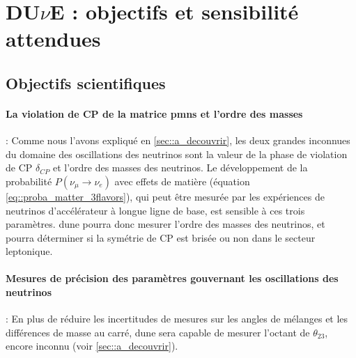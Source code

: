 
  \section{\texorpdfstring{DU$\nu$E}{DUNE} : objectifs et sensibilité attendues}\label{sec::dune}

    \subsection{Objectifs scientifiques}\label{sec::dune_pheno}

      \paragraph{La violation de CP de la matrice \gls{pmns} et l'ordre des masses} : Comme nous l'avons expliqué en \autoref{sec::a_decouvrir}, les deux grandes inconnues du domaine des oscillations des neutrinos sont la valeur de la phase de violation de CP $\delta_{CP}$ et l'ordre des masses des neutrinos. Le développement de la probabilité $P(\nu_{\mu}\to\nu_e)$ avec effets de matière (équation \eqref{eq::proba_matter_3flavors}), qui peut être mesurée par les expériences de neutrinos d'accélérateur à longue ligne de base, est sensible à ces trois paramètres. \gls{dune} pourra donc mesurer l'ordre des masses des neutrinos, et pourra déterminer si la symétrie de CP est brisée ou non dans le secteur leptonique.
        
      \paragraph{Mesures de précision des paramètres gouvernant les oscillations des neutrinos} : En plus de réduire les incertitudes de mesures sur les angles de mélanges et les différences de masse au carré, \gls{dune} sera capable de mesurer l'octant de \texorpdfstring{$\theta_{23}$}{theta23}, encore inconnu (voir \autoref{sec::a_decouvrir}).
        

